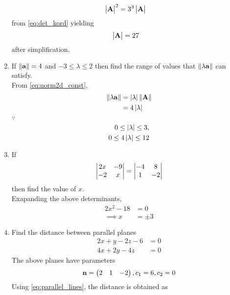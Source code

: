 \documentclass[journal,12pt,twocolumn]{IEEEtran}
\renewcommand\thesection{\arabic{section}}
\begin{document}
\begin{enumerate}[label=\thesection.\arabic*.,ref=\thesection.\theenumi]
\begin{align}
	  \begin{vmatrix}\mathbf{A}\end{vmatrix} ^2&=3^3\begin{vmatrix}\mathbf{ A}\end{vmatrix}
  \end{align}
  from 
	\eqref{eq:det_kord}
	yielding 
  \begin{align}
	  \begin{vmatrix}\mathbf{A}\end{vmatrix} &=27
  \end{align}
  after simplification.
\item  If $\left\lVert\mathbf{a}\right\rVert
	 = 4 $ and  $ -3\leq \lambda \leq 2 $ then find the range of values that $\left\lVert\lambda \mathbf{a}\right\rVert$ can satisfy.
	 \\
	 \solution  From 
  \eqref{eq:norm2d_const}, 
\begin{align}
  \left\lVert\lambda \mathbf{a}\right\rVert 
  &= \left\vert\lambda\right\vert \left\lVert\mathbf{A}\right\rVert
  \\
	&= 4\left\vert\lambda\right\vert 
\end{align}
$\because$
\begin{align}
	0 \leq \left\vert\lambda\right\vert \leq 3,  
\\
	0 \leq 4\left\vert\lambda\right\vert \leq 12
\end{align}

\item  If 
%
\begin{align}
	\begin{vmatrix} 2x & -9 \\ -2 & x \end{vmatrix} = \begin{vmatrix} -4 & 8 \\ 1 & -2\end{vmatrix} 
\end{align}
then find the value of $x$. 
\\
\solution
Exapanding the above determinants,
\begin{align}
	2x^2 - 18 &= 0
	\\
	\implies x &= \pm 3
\end{align}
\item  Find the distance between parallel planes 
	\begin{align}
		2x+y-2z-6&=0 
		\\
		4x+2y-4z&=0 
\end{align}
\solution The above planes have parameters
	\begin{align}
		\mathbf{n} = \begin{pmatrix}2 & 1 & -2\end{pmatrix}, c_1=6, c_2 = 0
\end{align}
Using 	\eqref{eq:parallel_lines},  the distance is obtained as


\end{enumerate}
\end{document}
